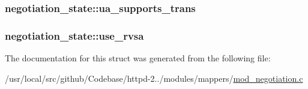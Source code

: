 \subsubsection[{\texorpdfstring{ua\+\_\+supports\+\_\+trans}{ua_supports_trans}}]{ negotiation\+\_\+state\+::ua\+\_\+supports\+\_\+trans}\hypertarget{structnegotiation__state_a99b8e250b291c99421c16c47163d8c01}{}\label{structnegotiation__state_a99b8e250b291c99421c16c47163d8c01}
\subsubsection[{\texorpdfstring{use\+\_\+rvsa}{use_rvsa}}]{ negotiation\+\_\+state\+::use\+\_\+rvsa}\hypertarget{structnegotiation__state_a62377e38615a3ce358ccd3444c498246}{}\label{structnegotiation__state_a62377e38615a3ce358ccd3444c498246}


The documentation for this struct was generated from the following file\+:\begin{DoxyCompactItemize}
\item 
/usr/local/src/github/\+Codebase/httpd-\/2../modules/mappers/\hyperlink{mod__negotiation_8c}{mod\+\_\+negotiation.\+c}\end{DoxyCompactItemize}
